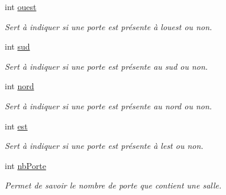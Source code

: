 \begin{DoxyCompactItemize}
\item 
\mbox{\label{structs__salle_af801a20654c4fc051404a6c19ed0e78e}} 
int \hyperlink{structs__salle_af801a20654c4fc051404a6c19ed0e78e}{ouest}
\begin{DoxyCompactList}\small\item\em Sert à indiquer si une porte est présente à l\textquotesingle{}ouest ou non. \end{DoxyCompactList}\item 
\mbox{\label{structs__salle_a26b98e722ab6c0854d32e79a737deea5}} 
int \hyperlink{structs__salle_a26b98e722ab6c0854d32e79a737deea5}{sud}
\begin{DoxyCompactList}\small\item\em Sert à indiquer si une porte est présente au sud ou non. \end{DoxyCompactList}\item 
\mbox{\label{structs__salle_ae81b5af45fffb04b6b41aea588cfd3ff}} 
int \hyperlink{structs__salle_ae81b5af45fffb04b6b41aea588cfd3ff}{nord}
\begin{DoxyCompactList}\small\item\em Sert à indiquer si une porte est présente au nord ou non. \end{DoxyCompactList}\item 
\mbox{\label{structs__salle_adde7fbe9a6fad9bcd5545cb57a5f8c52}} 
int \hyperlink{structs__salle_adde7fbe9a6fad9bcd5545cb57a5f8c52}{est}
\begin{DoxyCompactList}\small\item\em Sert à indiquer si une porte est présente à l\textquotesingle{}est ou non. \end{DoxyCompactList}\item 
\mbox{\label{structs__salle_af19a420c5efee4f6b5378aabef11ca03}} 
int \hyperlink{structs__salle_af19a420c5efee4f6b5378aabef11ca03}{nb\+Porte}
\begin{DoxyCompactList}\small\item\em Permet de savoir le nombre de porte que contient une salle. \end{DoxyCompactList}\item 
\mbox{\label{structs__salle_a14caa8d9cb661d72256f0e832879ab01}} 

\end{DoxyCompactItemize}
